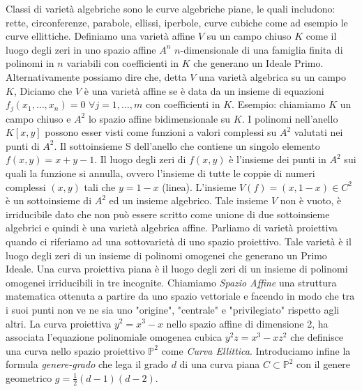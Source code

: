\documentclass[a4paper,12pt]{tesiinfo}
\begin{document}
Classi di variet\`a algebriche sono le curve algebriche piane, le quali includono: rette, circonferenze, parabole, ellissi, iperbole, curve cubiche come ad esempio le curve ellittiche.
\newline\newline
Definiamo una variet\`a affine $V$ su un campo chiuso $K$ come il luogo degli zeri in uno spazio affine $A^n$ $n$-dimensionale di una famiglia finita di polinomi in $n$ variabili con coefficienti in $K$ che generano un Ideale Primo. Alternativamente possiamo dire che, detta $V$ una variet\`a algebrica su un campo $K$, Diciamo che $V$ \`e una variet\`a affine se \`e data da un insieme di equazioni $f_j(x_1, \ldots , x_n) = 0$ $\forall j = 1, \ldots, m$ con coefficienti in $K$.
\newline
Esempio: chiamiamo $K$ un campo chiuso e $A^2$ lo spazio affine bidimensionale su $K$. I polinomi nell'anello $K[x, y]$ possono esser visti come funzioni a valori complessi su $A^2$ valutati nei punti di $A^2$. Il sottoinsieme S dell'anello che contiene un singolo elemento $f(x, y) = x + y - 1$. Il luogo degli zeri di $f(x, y)$ \`e l'insieme dei punti in $A^2$ sui quali la funzione si annulla, ovvero l'insieme di tutte le coppie di numeri complessi $(x, y)$ tali che $y = 1 - x$ (linea). L'insieme $V(f) = {(x, 1-x) \in C^2}$ \`e un sottoinsieme di $A^2$ ed un insieme algebrico. Tale insieme $V$ non \`e vuoto, \`e irriducibile dato che non pu\`o essere scritto come unione di due sottoinsieme algebrici e quindi \`e una variet\`a algebrica affine.
%
%
%
\newline\newline
Parliamo di variet\`a proiettiva quando ci riferiamo ad una sottovariet\`a di uno spazio proiettivo. Tale variet\`a \`e il luogo degli zeri di un insieme di polinomi omogenei che generano un Primo Ideale.
\newline
Una curva proiettiva piana \`e il luogo degli zeri di un insieme di polinomi omogenei irriducibili in tre incognite. Chiamiamo \textit{Spazio Affine} una struttura matematica ottenuta a partire da uno spazio vettoriale e facendo in modo che tra i suoi punti non ve ne sia uno "origine", "centrale" e "privilegiato" rispetto agli altri. La curva proiettiva $y^2 = x^3 -x$ nello spazio affine di dimensione 2, ha associata l'equazione polinomiale omogenea cubica $y^2z = x^3 - xz^2$ che definisce una curva nello spazio proiettivo $\mathbb{P}^2$ come \textit{Curva Ellittica}. 
\newline
Introduciamo infine la formula \textit{genere-grado} che lega il grado $d$ di una curva piana $C \subset \mathbb{P}^2$ con il genere geometrico $g = \frac{1}{2} (d-1)(d-2)$.
\end{document}
